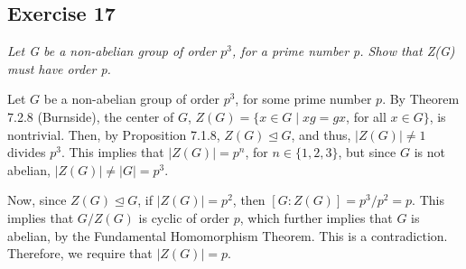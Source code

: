 \subsection*{Exercise 17}
\textit{Let G be a non-abelian group of order $p^3$, for a prime number p. Show that Z(G) must have order p.}

\vspace{5 mm}
Let $G$ be a non-abelian group of order $p^3$, for some prime number $p$. By Theorem 7.2.8 (Burnside), the center of $G$, $Z(G) = \{x \in G \mid xg = gx$, for all $x \in G\}$, is nontrivial. Then, by Proposition 7.1.8, $Z(G) \trianglelefteq G$, and thus, $|Z(G)| \not= 1$ divides $p^3$. This implies that $|Z(G)| = p^n$, for $n \in \{1,2,3\}$, but since $G$ is not abelian, $|Z(G)| \not= |G| = p^3$.

Now, since $Z(G) \trianglelefteq G$, if $|Z(G)| = p^2$, then $[G : Z(G)] = p^3/p^2 = p$. This implies that $G/Z(G)$ is cyclic of order $p$, which further implies that $G$ is abelian, by the Fundamental Homomorphism Theorem. This is a contradiction. Therefore, we require that $|Z(G)| = p$.